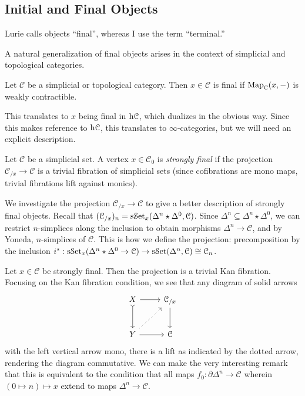 \subsection{Initial and Final Objects}

\begin{terminology}\label{1.2.12.1}
	Lurie calls objects ``final'',  whereas I use the term ``terminal.''
\end{terminology}

A natural generalization of final objects arises in the context of simplicial and topological categories.

\begin{definition}\label{1.2.12.2}
	Let $\mathcal{C} $ be a simplicial or topological category. Then $x\in \mathcal{C} $ is final if $\operatorname{Map}_{\mathcal{C} }(x, -) $ is weakly contractible.
\end{definition}

This translates to $x$ being final in $\mathrm{h} \mathcal{C} $, which dualizes in the obvious way. Since this makes reference to $\mathrm{h} \mathcal{C} $, this translates to $\infty $-categories, but we will need an explicit description.

\begin{definition}\label{1.2.12.3}
	Let $\mathcal{C} $ be a simplicial set. A vertex $x\in \mathcal{C} _0$ is \emph{strongly final} if the projection $\mathcal{C} _{/x} \to \mathcal{C} $ is a trivial fibration of simplicial sets (since cofibrations are mono maps, trivial fibrations lift against monics).
\end{definition}

We investigate the projection $\mathcal{C} _{/x} \to \mathcal{C} $ to give a better description of strongly final objects. Recall that $(\mathcal{C} _{/x} )_n=\mathrm{s}\mathcal{S}\mathrm{et} _x(\Delta ^n\star \Delta ^0,\mathcal{C} )$. Since $\Delta ^n \subseteq \Delta ^n\star \Delta ^0$, we can restrict $n$-simplices along the inclusion to obtain morphisms $\Delta ^n\to \mathcal{C} $, and by Yoneda, $n$-simplices of $\mathcal{C} $. This is how we define the projection: precomposition by the inclusion $i^* : \mathrm{s}\mathcal{S}\mathrm{et}_x(\Delta ^n\star \Delta ^0 \to \mathcal{C} )\to \mathrm{s}\mathcal{S}\mathrm{et}(\Delta ^n,\mathcal{C} )\cong \mathcal{C} _n$.

Let $x\in \mathcal{C} $ be strongly final. Then the projection is a trivial Kan fibration. Focusing on the Kan fibration condition, we see that any diagram of solid arrows
\[\begin{tikzcd}[row sep = 2.5em, column sep = 2.5em]
X \ar[tail, d] \ar[r]  & \mathcal{C}_{/x} \ar[d]  \\
Y \ar[r] \ar[dotted, ur]  & \mathcal{C} 
\end{tikzcd}\]
with the left vertical arrow mono, there is a lift as indicated by the dotted arrow, rendering the diagram commutative. We can make the very interesting remark that this is equivalent to the condition that all maps $f_0: \partial \Delta ^n \to \mathcal{C} $ wherein $(0\mapsto n)\mapsto x$ extend to maps $\Delta ^n\to \mathcal{C} $.

